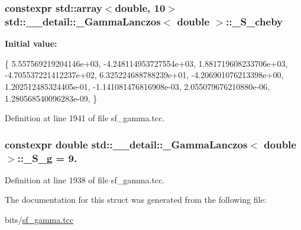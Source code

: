 \subsubsection[{\texorpdfstring{\+\_\+\+S\+\_\+cheby}{_S_cheby}}]{\setlength{\rightskip}{0pt plus 5cm}constexpr std\+::array$<$double, 10$>$ {\bf std\+::\+\_\+\+\_\+detail\+::\+\_\+\+Gamma\+Lanczos}$<$ double $>$\+::\+\_\+\+S\+\_\+cheby\hspace{0.3cm}{\ttfamily [static]}}\hypertarget{structstd_1_1____detail_1_1__GammaLanczos_3_01double_01_4_a6cea35dc57e82b17c764fe3814eeab74}{}\label{structstd_1_1____detail_1_1__GammaLanczos_3_01double_01_4_a6cea35dc57e82b17c764fe3814eeab74}
{\bfseries Initial value\+:}
\begin{DoxyCode}
\{
    5.557569219204146e+03,
    -4.248114953727554e+03,
    1.881719608233706e+03,
    -4.705537221412237e+02,
    6.325224688788239e+01,
    -4.206901076213398e+00,
    1.202512485324405e-01,
    -1.141081476816908e-03,
    2.055079676210880e-06,
    1.280568540096283e-09,
      \}
\end{DoxyCode}


Definition at line 1941 of file sf\+\_\+gamma.\+tcc.

\subsubsection[{\texorpdfstring{\+\_\+\+S\+\_\+g}{_S_g}}]{\setlength{\rightskip}{0pt plus 5cm}constexpr double {\bf std\+::\+\_\+\+\_\+detail\+::\+\_\+\+Gamma\+Lanczos}$<$ double $>$\+::\+\_\+\+S\+\_\+g = 9.\hspace{0.3cm}{\ttfamily [static]}}\hypertarget{structstd_1_1____detail_1_1__GammaLanczos_3_01double_01_4_aee7a7cabdd8c5e91cf63eb2ce00fb7bf}{}\label{structstd_1_1____detail_1_1__GammaLanczos_3_01double_01_4_aee7a7cabdd8c5e91cf63eb2ce00fb7bf}


Definition at line 1938 of file sf\+\_\+gamma.\+tcc.



The documentation for this struct was generated from the following file\+:\begin{DoxyCompactItemize}
\item 
bits/\hyperlink{sf__gamma_8tcc}{sf\+\_\+gamma.\+tcc}\end{DoxyCompactItemize}
